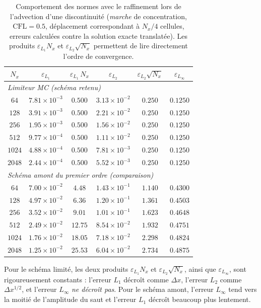 \documentclass[11pt,a4paper]{report}
\begin{document}
\begin{table}[H]
\centering
\caption{Comportement des normes avec le raffinement lors de l'advection d'une discontinuité
(\emph{marche} de concentration, \(\mathrm{CFL} = 0.5\), déplacement correspondant à \(N_x/4\) cellules,
erreurs calculées contre la solution exacte translatée). Les produits \(\varepsilon_{L_1}N_x\) et
\(\varepsilon_{L_2}\sqrt{N_x}\) permettent de lire directement l'ordre de convergence.}
\label{tab:convergence-front}
\small
\begin{tabular}{cccccc}
\toprule
\(N_x\) & \(\varepsilon_{L_1}\) & \(\varepsilon_{L_1}\,N_x\) & \(\varepsilon_{L_2}\)
& \(\varepsilon_{L_2}\sqrt{N_x}\) & \(\varepsilon_{L_\infty}\) \\
\midrule
\multicolumn{6}{l}{\emph{Limiteur MC (schéma retenu)}}\\
\(64\)  & \(7.81\times10^{-3}\) & \(0.500\) & \(3.13\times10^{-2}\) & \(0.250\) & \(0.1250\) \\
\(128\) & \(3.91\times10^{-3}\) & \(0.500\) & \(2.21\times10^{-2}\) & \(0.250\) & \(0.1250\) \\
\(256\) & \(1.95\times10^{-3}\) & \(0.500\) & \(1.56\times10^{-2}\) & \(0.250\) & \(0.1250\) \\
\(512\) & \(9.77\times10^{-4}\) & \(0.500\) & \(1.11\times10^{-2}\) & \(0.250\) & \(0.1250\) \\
\(1024\) & \(4.88\times10^{-4}\) & \(0.500\) & \(7.81\times10^{-3}\) & \(0.250\) & \(0.1250\) \\
\(2048\) & \(2.44\times10^{-4}\) & \(0.500\) & \(5.52\times10^{-3}\) & \(0.250\) & \(0.1250\) \\
\midrule
\multicolumn{6}{l}{\emph{Schéma amont du premier ordre (comparaison)}}\\
\(64\)  & \(7.00\times10^{-2}\) & \(4.48\) & \(1.43\times10^{-1}\) & \(1.140\) & \(0.4300\) \\
\(128\) & \(4.97\times10^{-2}\) & \(6.36\) & \(1.20\times10^{-1}\) & \(1.361\) & \(0.4503\) \\
\(256\) & \(3.52\times10^{-2}\) & \(9.01\) & \(1.01\times10^{-1}\) & \(1.623\) & \(0.4648\) \\
\(512\) & \(2.49\times10^{-2}\) & \(12.75\) & \(8.54\times10^{-2}\) & \(1.932\) & \(0.4751\) \\
\(1024\) & \(1.76\times10^{-2}\) & \(18.05\) & \(7.18\times10^{-2}\) & \(2.298\) & \(0.4824\) \\
\(2048\) & \(1.25\times10^{-2}\) & \(25.53\) & \(6.04\times10^{-2}\) & \(2.734\) & \(0.4875\) \\
\bottomrule
\end{tabular}
\begin{tablenotes}
\small
\item Pour le schéma limité, les deux produits \(\varepsilon_{L_1}N_x\) et
\(\varepsilon_{L_2}\sqrt{N_x}\), ainsi que \(\varepsilon_{L_\infty}\), sont rigoureusement constants :
l'erreur \(L_1\) décroît comme \(\Delta x\), l'erreur \(L_2\) comme \(\Delta x^{1/2}\), et l'erreur
\(L_\infty\) \emph{ne décroît pas}. Pour le schéma amont, l'erreur \(L_\infty\) tend vers la moitié de
l'amplitude du saut et l'erreur \(L_1\) décroît beaucoup plus lentement.
\end{tablenotes}
\end{table}
\end{document}
